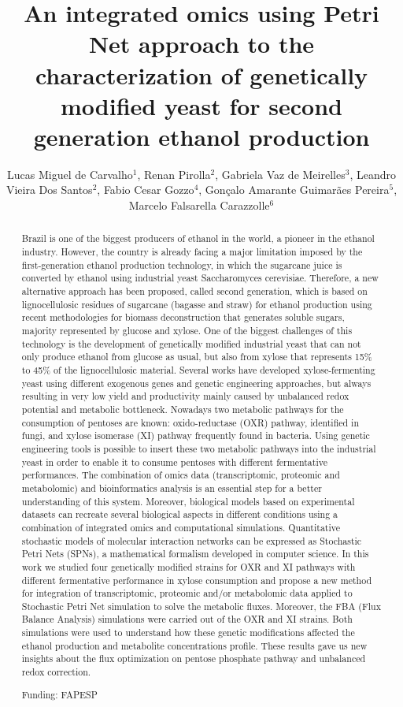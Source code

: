 \documentclass[twoside]{article}
\title{\vspace{-15mm}\fontsize{24pt}{10pt}\selectfont\textbf{An integrated omics using Petri Net approach to the characterization of genetically modified yeast for second generation ethanol production}} %
\author{Lucas Miguel de Carvalho$^1$, Renan Pirolla$^2$, Gabriela Vaz de Meirelles$^3$, Leandro Vieira Dos Santos$^2$, Fabio Cesar Gozzo$^4$, Gon\c{c}alo Amarante Guimar\~aes Pereira$^5$, Marcelo Falsarella Carazzolle$^6$}
\affil{1 UNICAMP\\ 2 CNPEM - CTBE\\ 3 LGE - UNICAMP\\ 4 UNICAMP - IQ\\ 5 BRAZILIAN BIOETHANOL SCIENCE AND TECHNOLOGY LABORATORY CTBE, BRAZILIAN CENTER FOR RESEARCH IN ENERGY AND MATERIALS CNPEM, BIOLOGY INSTITUTE - UNICAMP\\ 6 BIOLOGY INSTITUTE - UNICAMP, NATIONAL CENTER FOR HIGH PERFORMANCE COMPUTING CENAPAD-SP/UNICAMP\\ }
\date{}
\begin{document}
\maketitle %

\thispagestyle{fancy} %


\begin{abstract}
Brazil is one of the biggest producers of ethanol in the world, a pioneer in the ethanol industry. However, the country is already facing a major limitation imposed by the first-generation ethanol production technology, in which the sugarcane juice is converted by ethanol using industrial yeast Saccharomyces cerevisiae. Therefore, a new alternative approach has been proposed, called second generation, which is based on lignocellulosic residues of sugarcane (bagasse and straw) for ethanol production using recent methodologies for biomass deconstruction that generates soluble sugars, majority represented by glucose and xylose. One of the biggest challenges of this technology is the development of genetically modified industrial yeast that can not only produce ethanol from glucose as usual, but also from xylose that represents 15\% to 45\% of the lignocellulosic material. Several works have developed xylose-fermenting yeast using different exogenous genes and genetic engineering approaches, but always resulting in very low yield and productivity mainly caused by unbalanced redox potential and metabolic bottleneck. Nowadays two metabolic pathways for the consumption of pentoses are known: oxido-reductase (OXR) pathway, identified in fungi, and xylose isomerase (XI) pathway frequently found in bacteria. Using genetic engineering tools is possible to insert these two metabolic pathways into the industrial yeast in order to enable it to consume pentoses with different fermentative performances. The combination of omics data (transcriptomic, proteomic and metabolomic) and bioinformatics analysis is an essential step for a better understanding of this system. Moreover, biological models based on experimental datasets can recreate several biological aspects in different conditions using a combination of integrated omics and computational simulations. Quantitative stochastic models of molecular interaction networks can be expressed as Stochastic Petri Nets (SPNs), a mathematical formalism developed in computer science. In this work we studied four genetically modified strains for OXR and XI pathways with different fermentative performance in xylose consumption and propose a new method for integration of transcriptomic, proteomic and/or metabolomic data applied to Stochastic Petri Net simulation to solve the metabolic fluxes. Moreover, the FBA (Flux Balance Analysis) simulations were carried out of the OXR and XI strains. Both simulations were used to understand how these genetic modifications affected the ethanol production and metabolite concentrations profile. These results gave us new insights about the flux optimization on pentose phosphate pathway and unbalanced redox correction.

Funding: FAPESP
\end{abstract}
\end{document}
